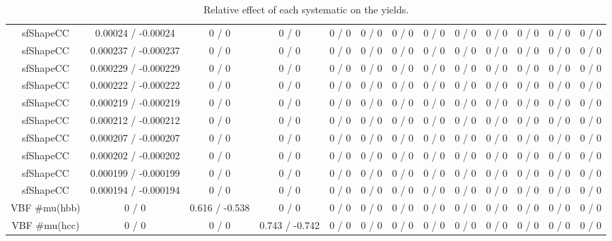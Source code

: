 \documentclass[10pt]{article}
\begin{document}
\begin{table}[htbp]
\begin{center}
\begin{tabular}{|c|c|c|c|c|c|c|c|c|c|c|c|c|}
  sfShapeCC & 0.00024 / -0.00024 & 0 / 0 & 0 / 0 & 0 / 0 & 0 / 0 & 0 / 0 & 0 / 0 & 0 / 0 & 0 / 0 & 0 / 0 & 0 / 0 & 0 / 0 \\ 
  sfShapeCC & 0.000237 / -0.000237 & 0 / 0 & 0 / 0 & 0 / 0 & 0 / 0 & 0 / 0 & 0 / 0 & 0 / 0 & 0 / 0 & 0 / 0 & 0 / 0 & 0 / 0 \\ 
  sfShapeCC & 0.000229 / -0.000229 & 0 / 0 & 0 / 0 & 0 / 0 & 0 / 0 & 0 / 0 & 0 / 0 & 0 / 0 & 0 / 0 & 0 / 0 & 0 / 0 & 0 / 0 \\ 
  sfShapeCC & 0.000222 / -0.000222 & 0 / 0 & 0 / 0 & 0 / 0 & 0 / 0 & 0 / 0 & 0 / 0 & 0 / 0 & 0 / 0 & 0 / 0 & 0 / 0 & 0 / 0 \\ 
  sfShapeCC & 0.000219 / -0.000219 & 0 / 0 & 0 / 0 & 0 / 0 & 0 / 0 & 0 / 0 & 0 / 0 & 0 / 0 & 0 / 0 & 0 / 0 & 0 / 0 & 0 / 0 \\ 
  sfShapeCC & 0.000212 / -0.000212 & 0 / 0 & 0 / 0 & 0 / 0 & 0 / 0 & 0 / 0 & 0 / 0 & 0 / 0 & 0 / 0 & 0 / 0 & 0 / 0 & 0 / 0 \\ 
  sfShapeCC & 0.000207 / -0.000207 & 0 / 0 & 0 / 0 & 0 / 0 & 0 / 0 & 0 / 0 & 0 / 0 & 0 / 0 & 0 / 0 & 0 / 0 & 0 / 0 & 0 / 0 \\ 
  sfShapeCC & 0.000202 / -0.000202 & 0 / 0 & 0 / 0 & 0 / 0 & 0 / 0 & 0 / 0 & 0 / 0 & 0 / 0 & 0 / 0 & 0 / 0 & 0 / 0 & 0 / 0 \\ 
  sfShapeCC & 0.000199 / -0.000199 & 0 / 0 & 0 / 0 & 0 / 0 & 0 / 0 & 0 / 0 & 0 / 0 & 0 / 0 & 0 / 0 & 0 / 0 & 0 / 0 & 0 / 0 \\ 
  sfShapeCC & 0.000194 / -0.000194 & 0 / 0 & 0 / 0 & 0 / 0 & 0 / 0 & 0 / 0 & 0 / 0 & 0 / 0 & 0 / 0 & 0 / 0 & 0 / 0 & 0 / 0 \\ 
  VBF #mu(hbb) & 0 / 0 & 0.616 / -0.538 & 0 / 0 & 0 / 0 & 0 / 0 & 0 / 0 & 0 / 0 & 0 / 0 & 0 / 0 & 0 / 0 & 0 / 0 & 0 / 0 \\ 
  VBF #mu(hcc) & 0 / 0 & 0 / 0 & 0.743 / -0.742 & 0 / 0 & 0 / 0 & 0 / 0 & 0 / 0 & 0 / 0 & 0 / 0 & 0 / 0 & 0 / 0 & 0 / 0 \\ 
\hline 
\end{tabular} 
\caption{Relative effect of each systematic on the yields.} 
\end{center} 
\end{table} 
\end{document}
